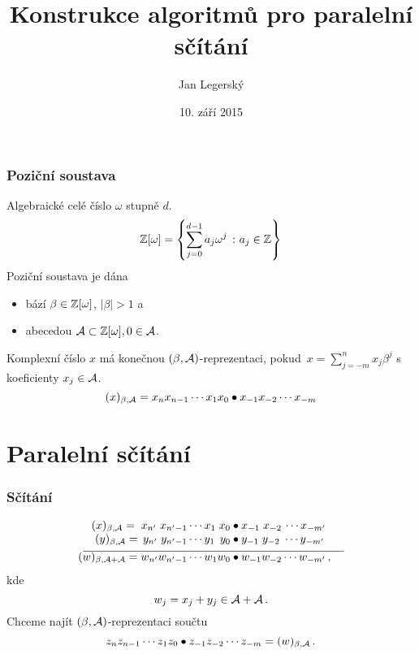 \documentclass[11pt]{beamer}
\title{Konstrukce algoritmů pro paralelní sčítání}
\institute{TIGR \\
                \url{jan.legersky@gmail.com} \\
					\rule{0cm}{0mm} \\
					\rule{0cm}{0mm} \\
					Obhajoba výzkumného úkolu}
\author{Jan Legersk\'y}
\date{10. září 2015}
\begin{document}
\begin{frame}
  \titlepage
\end{frame}

\begin{frame}
  \tableofcontents
\end{frame}



\begin{frame}
  \frametitle{Poziční soustava}
  Algebraické celé číslo $\omega$ stupně $d$.
  $$\mathbb{Z}[\omega]= \left\{\sum_{j=0}^{d-1} a_j \omega^j\ \colon  a_j \in \mathbb{Z} \right\}$$
  \pause
  Poziční soustava je dána
  \begin{itemize}
    \item bází $\beta \in \mathbb{Z}[\omega]$, $|\beta|>1$ a
    \item abecedou $\mathcal{A} \subset \mathbb{Z}[\omega] , 0\in \mathcal{A}$. 
  \end{itemize}
  
  \pause
  
  Komplexní číslo $x$ má konečnou  $(\beta, \mathcal{A})$-reprezentaci, pokud~$x=\sum_{j=-m}^n x_j \beta^j$ s koeficienty $x_j\in\mathcal{A}$.
  $$
    (x)_{\beta,\mathcal{A}}=x_n x_{n-1}\cdots x_1 x_0 \bullet x_{-1} x_{-2} \cdots x_{-m}
  $$ 
\end{frame}

\section{Paralelní sčítání}
\begin{frame}
  \frametitle{Sčítání}
    \begin{align*}
  (x)_{\beta,\A}=\;x_{n'} \;x_{{n'}-1}\cdots x_1 \;x_0 &\bullet x_{-1} \;x_{-2}\, \cdots x_{-m'} \\[-3pt]
  (y)_{\beta,\A}=\,y_{n'} \;y_{{n'}-1}\cdots y_1 \,\;y_0 &\bullet y_{-1} \;y_{-2} \;\cdots y_{-m'} \\[-7pt]
    \line(1,0){130} & \line(1,0){100} \\[-7pt]
  (w)_{\beta,\A+\A}=w_{n'} w_{{n'}-1}\cdots w_1 w_0 &\bullet w_{-1} w_{-2} \cdots w_{-m'}\,,
  \end{align*}
  kde
  $$
    w_j=x_j+y_j \in \mathcal{A} +\mathcal{A}\,.
  $$
  \pause
  Chceme najít $(\beta,\mathcal{A})$-reprezentaci součtu
  $$
    z_{n} z_{n-1}\cdots z_1 z_0 \bullet z_{-1} z_{-2} \cdots z_{-m}=(w)_{\beta,\mathcal{A}}\,.
  $$ 
\end{frame}
\end{document}
